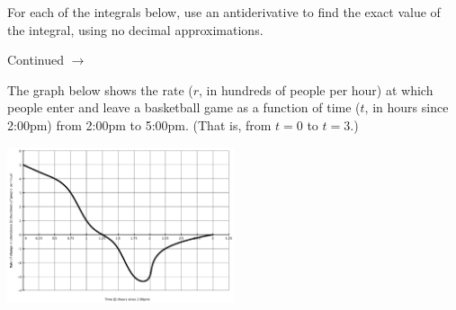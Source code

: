 \documentclass[addpoints]{exam}
\def\pageturn{\vfill
\begin{flushright}
	\begin{small}
		Continued $\rightarrow$
	\end{small}
\end{flushright}
\newpage}
\begin{document}
\begin{questions}

\question For each of the integrals below, use an antiderivative to find the exact value of the integral, using no decimal approximations. 

\pageturn

\question The graph below shows the rate ($r$, in hundreds of people per hour) at which people enter and leave a basketball game as a function of time ($t$, in hours since 2:00pm) from 2:00pm to 5:00pm. (That is, from $t=0$ to $t=3$.) 
\begin{center}
	\includegraphics[width=0.5\textwidth]{fe-totalchange}
\end{center}


\end{questions}
\end{document}
